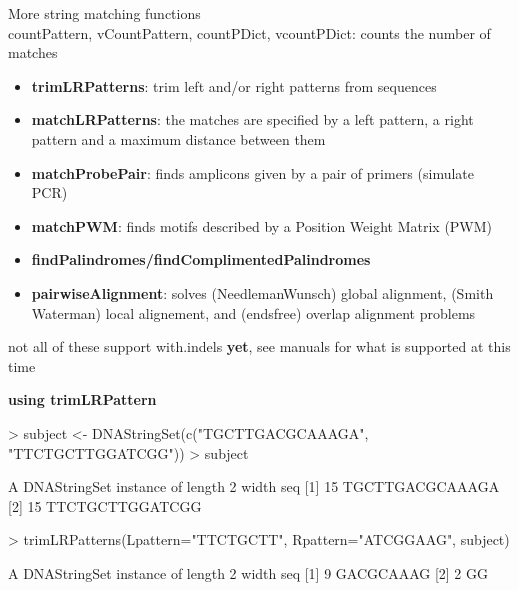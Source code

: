 \documentclass[pdf]{beamer}
\begin{document}
\begin{frame}
More string matching functions\\
countPattern, vCountPattern, countPDict, vcountPDict: counts the number of matches
\begin{small}
\begin{itemize}
  \item \textbf{trimLRPatterns}: trim left and/or right patterns from sequences
  \item \textbf{matchLRPatterns}: the matches are specified by a left pattern, a right pattern and a maximum distance between them
  \item \textbf{matchProbePair}: finds amplicons given by a pair of primers (simulate PCR)
  \item \textbf{matchPWM}: finds motifs described by a Position Weight Matrix (PWM)
  \item \textbf{findPalindromes/findComplimentedPalindromes}
  \item \textbf{pairwiseAlignment}: solves (NeedlemanWunsch) global alignment, (Smith Waterman) local alignement, and (endsfree) overlap alignment problems
\end{itemize}
\end{small}
not all of these support with.indels \textbf{yet}, see manuals for what is supported at this time 
\end{frame}

\begin{frame}[fragile]
\textbf{using trimLRPattern}
\begin{block}{}
\begin{footnotesize}
\begin{Schunk}
\begin{Sinput}
> subject <- DNAStringSet(c("TGCTTGACGCAAAGA", "TTCTGCTTGGATCGG"))
> subject
\end{Sinput}
\begin{Soutput}
  A DNAStringSet instance of length 2
    width seq
[1]    15 TGCTTGACGCAAAGA
[2]    15 TTCTGCTTGGATCGG
\end{Soutput}
\begin{Sinput}
> trimLRPatterns(Lpattern="TTCTGCTT", Rpattern="ATCGGAAG", subject)
\end{Sinput}
\begin{Soutput}
  A DNAStringSet instance of length 2
    width seq
[1]     9 GACGCAAAG
[2]     2 GG
\end{Soutput}
\end{Schunk}
\end{footnotesize}
\end{block}
\end{frame}
\end{document}
